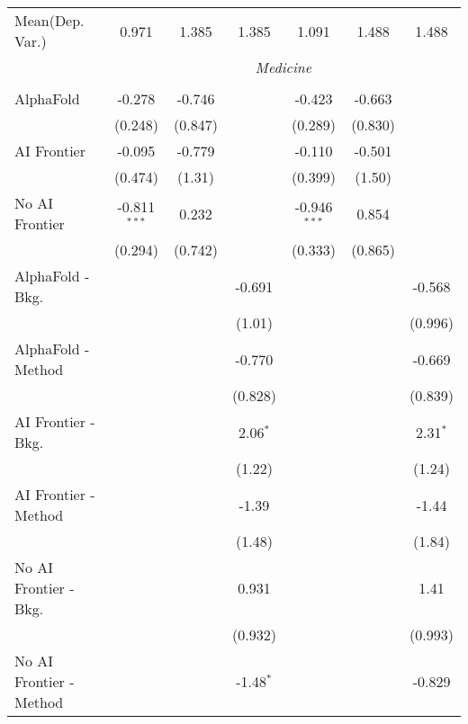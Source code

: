 \begin{tabular}{lcccccc}
Mean(Dep. Var.) & 0.971 & 1.385 & 1.385 & 1.091 & 1.488 & 1.488 \\
 & \multicolumn{6}{c}{\textit{Medicine}} \\ \\
   AlphaFold               & -0.278         & -0.746  &             & -0.423         & -0.663  &   \\   
                           & (0.248)        & (0.847) &             & (0.289)        & (0.830) &   \\   
   AI Frontier             & -0.095         & -0.779  &             & -0.110         & -0.501  &   \\   
                           & (0.474)        & (1.31)  &             & (0.399)        & (1.50)  &   \\   
   No AI Frontier          & -0.811$^{***}$ & 0.232   &             & -0.946$^{***}$ & 0.854   &   \\   
                           & (0.294)        & (0.742) &             & (0.333)        & (0.865) &   \\   
   AlphaFold - Bkg.        &                &         & -0.691      &                &         & -0.568\\   
                           &                &         & (1.01)      &                &         & (0.996)\\   
   AlphaFold - Method      &                &         & -0.770      &                &         & -0.669\\   
                           &                &         & (0.828)     &                &         & (0.839)\\   
   AI Frontier - Bkg.      &                &         & 2.06$^{*}$  &                &         & 2.31$^{*}$\\   
                           &                &         & (1.22)      &                &         & (1.24)\\   
   AI Frontier - Method    &                &         & -1.39       &                &         & -1.44\\   
                           &                &         & (1.48)      &                &         & (1.84)\\   
   No AI Frontier - Bkg.   &                &         & 0.931       &                &         & 1.41\\   
                           &                &         & (0.932)     &                &         & (0.993)\\   
   No AI Frontier - Method &                &         & -1.48$^{*}$ &                &         & -0.829\\   

\end{tabular}
